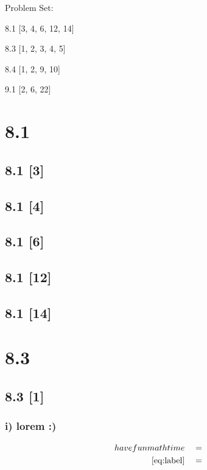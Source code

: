 \documentclass{article}
\begin{document}
{\large \noindent Problem Set:}

\par 8.1 [3, 4, 6, 12, 14]
\par 8.3 [1, 2, 3, 4, 5]
\par 8.4 [1, 2, 9, 10]
\par 9.1 [2, 6, 22]
\vspace{5mm}

\noindent \hrulefill

\section*{8.1}
\setcounter{equation}{0}

\subsection*{8.1 [3]}
\setcounter{equation}{0}

\subsection*{8.1 [4]}
\subsection*{8.1 [6]}
\subsection*{8.1 [12]}
\subsection*{8.1 [14]}

\newpage

\section*{8.3}
\setcounter{equation}{0}

\subsection*{8.3 [1]}

\subsubsection*{i) lorem :)}

\begin{align}
    \label{eq:label}
    have fun math time && &=
    \\
    \label{eq:label2}
    \eqref{eq:label} && &=
\end{align}
\end{document}
